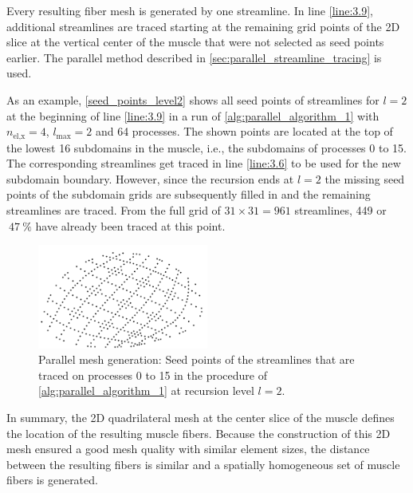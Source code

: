 Every resulting fiber mesh is generated by one streamline. In line \ref{line:3.9}, additional streamlines are traced starting at the remaining grid points of the 2D slice at the vertical center of the muscle that were not selected as seed points earlier. The parallel method described in \cref{sec:parallel_streamline_tracing} is used.

As an example, \cref{seed_points_level2} shows all seed points of streamlines for $l=2$ at the beginning of line \ref{line:3.9} in a run of \cref{alg:parallel_algorithm_1} with $n_\text{el,x}=4$, $l_\text{max}=2$ and 64 processes. 
The shown points are located at the top of the lowest 16 subdomains in the muscle, i.e., the subdomains of processes 0 to 15. The corresponding streamlines get traced in line \ref{line:3.6} to be used for the new subdomain boundary. However, since the recursion ends at $l=2$ the missing seed points of the subdomain grids are subsequently filled in and the remaining streamlines are traced. From the full grid of $31\times 31=\num{961}$ streamlines, \num{449} or $~\SI{47}{\percent}$ have already been traced at this point.

\begin{figure}
  \centering
  \includegraphics[width=0.5\textwidth]{images/parallel_fiber_estimation/seed_points_level2.png}
  \caption{Parallel mesh generation: Seed points of the streamlines that are traced on processes 0 to 15 in the procedure of \cref{alg:parallel_algorithm_1} at recursion level $l=2$.}
  \label{fig:seed_points_level2}%
\end{figure}


In summary, the 2D quadrilateral mesh at the center slice of the muscle defines the location of the resulting muscle fibers. Because the construction of this 2D mesh ensured a good mesh quality with similar element sizes, the distance between the resulting fibers is similar and a spatially homogeneous set of muscle fibers is generated.

